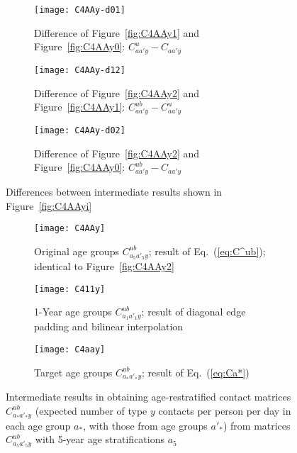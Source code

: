 \begin{figure}
  \begin{subfigure}{\linewidth}
    \texttt{[image: C4AAy-d01]}
    \caption{Difference of Figure~\ref{fig:C4AAy1} and Figure~\ref{fig:C4AAy0}: $C^{u}_{aa'y} - C_{aa'y}$}
    \label{fig:C4AAyd01}
  \end{subfigure}
  \begin{subfigure}{\linewidth}
    \texttt{[image: C4AAy-d12]}
    \caption{Difference of Figure~\ref{fig:C4AAy2} and Figure~\ref{fig:C4AAy1}: $C^{ub}_{aa'y} - C^{u}_{aa'y}$}
    \label{fig:C4AAyd12}
  \end{subfigure}
  \begin{subfigure}{\linewidth}
    \texttt{[image: C4AAy-d02]}
    \caption{Difference of Figure~\ref{fig:C4AAy2} and Figure~\ref{fig:C4AAy0}: $C^{ub}_{aa'y} - C_{aa'y}$}
    \label{fig:C4AAyd02}
  \end{subfigure}
  \caption{Differences between intermediate results shown in Figure~\ref{fig:C4AAyi}}
  \label{fig:C4AAyd}
\end{figure}
\begin{figure}
  \begin{subfigure}{\linewidth}
    \texttt{[image: C4AAy]}
    \caption{Original age groups $C^{ub}_{a_5a'_5y}$; result of Eq.~(\ref{eq:C^ub}); identical to Figure~\ref{fig:C4AAy2}}
    \label{fig:C4AAy}
  \end{subfigure}
  \begin{subfigure}{\linewidth}
    \texttt{[image: C411y]}
    \caption{1-Year age groups $C^{ub}_{a_1a'_1y}$; result of diagonal edge padding and bilinear interpolation}
    \label{fig:C411y}
  \end{subfigure}
  \begin{subfigure}{\linewidth}
    \texttt{[image: C4aay]}
    \caption{Target age groups $C^{ub}_{a_*a'_*y}$; result of Eq.~(\ref{eq:Ca*})}
    \label{fig:C4aay}
  \end{subfigure}
  \caption{Intermediate results in obtaining age-restratified contact matrices $C^{ub}_{a_*a'_*y}$
    (expected number of type $y$ contacts per person per day in each age group $a_*$, with those from age groups $a'_*$)
    from matrices $C^{ub}_{a_5a'_5y}$ with 5-year age stratifications $a_5$}
  \label{fig:C4**y}
\end{figure}
